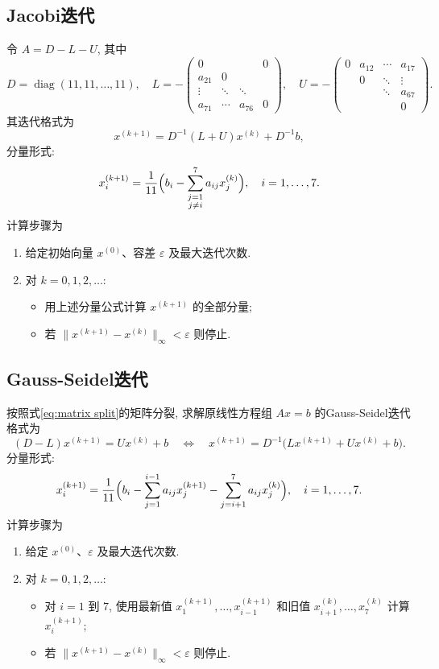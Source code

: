 \documentclass[zihao=-4,a4paper]{ctexart}
\begin{document}
\subsection{Jacobi迭代}
令 $A = D - L - U$, 其中
\begin{equation}\label{eq:matrix split}
    D = \operatorname{diag}(11,11,\dots,11),\quad
    L = -\begin{pmatrix}
    0 &  &  & 0\\
    a_{21} & 0 &  & \\
    \vdots & \ddots & \ddots & \\
    a_{71} & \cdots & a_{76} & 0
    \end{pmatrix},\quad
    U = -\begin{pmatrix}
    0 & a_{12} & \cdots & a_{17}\\
    & 0 & \ddots & \vdots\\
    & & \ddots & a_{67}\\
    & & & 0
\end{pmatrix}.
\end{equation}
其迭代格式为\[
x^{(k+1)} = D^{-1}(L+U)x^{(k)} + D^{-1}b,
\]
分量形式: 
\[
x_i^{(k+1)} = \frac{1}{11}\Bigl(b_i - \sum_{\substack{j=1\\ j\neq i}}^{7} a_{ij}x_j^{(k)}\Bigr), \quad i=1,\dots,7.
\]
计算步骤为\begin{enumerate}
\item 给定初始向量 $x^{(0)}$、容差 $\varepsilon$ 及最大迭代次数. 
\item 对 $k=0,1,2,\dots$: 
   \begin{itemize}
   \item 用上述分量公式计算 $x^{(k+1)}$ 的全部分量; 
   \item 若 $\|x^{(k+1)}-x^{(k)}\|_\infty<\varepsilon$ 则停止. 
   \end{itemize}
\end{enumerate}

\subsection{Gauss-Seidel迭代}
按照式\eqref{eq:matrix split}的矩阵分裂, 求解原线性方程组 $Ax=b$ 的Gauss-Seidel迭代格式为
\[
(D-L)x^{(k+1)} = Ux^{(k)} + b \quad\Longleftrightarrow\quad
x^{(k+1)} = D^{-1}\bigl(L x^{(k+1)} + U x^{(k)} + b\bigr).
\]
分量形式: 
\[
x_i^{(k+1)} = \frac{1}{11}\Bigl(b_i - \sum_{j=1}^{i-1} a_{ij}x_j^{(k+1)} - \sum_{j=i+1}^{7} a_{ij}x_j^{(k)}\Bigr), \quad i=1,\dots,7.
\]
计算步骤为\begin{enumerate}
\item 给定 $x^{(0)}$、$\varepsilon$ 及最大迭代次数. 
\item 对 $k=0,1,2,\dots$: 
   \begin{itemize}
   \item 对 $i=1$ 到 $7$, 使用最新值 $x_1^{(k+1)},\dots,x_{i-1}^{(k+1)}$ 和旧值 $x_{i+1}^{(k)},\dots,x_7^{(k)}$ 计算 $x_i^{(k+1)}$; 
   \item 若 $\|x^{(k+1)}-x^{(k)}\|_\infty<\varepsilon$ 则停止. 
   \end{itemize}
\end{enumerate}
\end{document}
